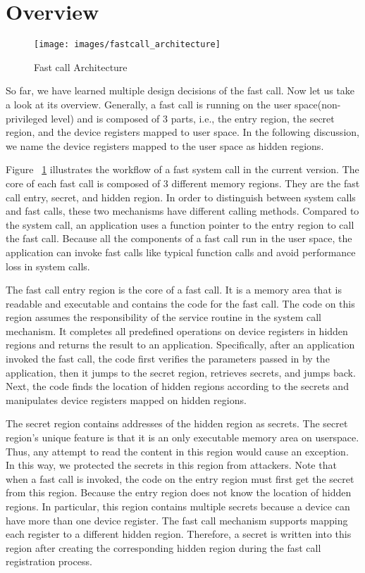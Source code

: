 \section{Overview}
\begin{figure}[tbp]
  \centering
  \texttt{[image: images/fastcall\_architecture]}
  \caption[Short description]{Fast call Architecture}
  \label{fig:fastcall_architecture}
\end{figure}



So far, we have learned multiple design decisions of the fast call. 
Now let us take a look at its overview. Generally, 
a fast call is running on the user space(non-privileged level) and is 
composed of 3 parts, i.e., the entry region, the secret region, and the 
device registers mapped to user space. 	In the following discussion, 
we name the device registers mapped to the user space as hidden regions.

Figure ~\ref{fig:fastcall_architecture} illustrates the 
workflow of a fast system call in the current 
version. The core of each fast call is composed of 3 different 
memory regions. They are the fast call entry, secret, and hidden region. 
In order to distinguish between system calls and fast calls, these two 
mechanisms have different calling methods. Compared to the system call, 
an application uses a function pointer to the entry region to call the fast call. Because all 
the components of a fast call run in the user space, the application can 
invoke fast calls like typical function calls and avoid performance 
loss in system calls.

The fast call entry region is the core of a fast call. It is a memory area that is readable and 
executable and contains the code for the fast call. The code on this region assumes the responsibility 
of the service routine in the system call mechanism. It completes all predefined operations on device 
registers in hidden regions and returns the result to an application. Specifically, after an application 
invoked the fast call, the code first verifies the parameters passed in by the application, then it jumps 
to the secret region, retrieves secrets, and jumps back.  Next, the code finds the location of hidden 
regions according to the secrets and manipulates device registers mapped on hidden regions. 

The secret region contains addresses of the hidden region as secrets. 
The secret region's unique feature is that it is an only executable memory area on userspace. 
Thus, any attempt to read the content in this region would cause an exception. In this way, 
we protected the secrets in this region from attackers.  Note that when a fast call is invoked, 
the code on the entry region must first get the secret from this region. Because the entry region does 
not know the location of hidden regions.  In particular,  this region contains multiple secrets because
 a device can have more than one device register. The fast call mechanism supports mapping each register 
 to a different hidden region. Therefore, a secret is written into this region after creating the 
 corresponding hidden region during the fast call registration process.

